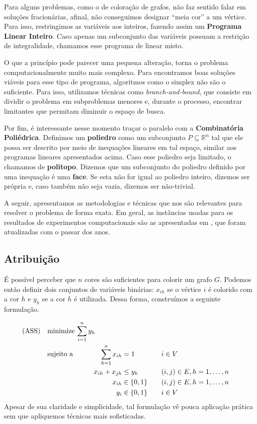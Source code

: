 \documentclass[11pt]{article}
\begin{document}
Para alguns problemas, como o de coloração de grafos, não faz sentido falar em soluções fracionárias, afinal, não conseguimos designar ``meia cor'' a um vértice.
Para isso, restringimos as variáveis aos inteiros, fazendo assim um \textbf{Programa Linear Inteiro}. Caso apenas um subconjunto das variáveis possuam a restrição de integralidade, chamamos esse programa de linear misto.

O que a princípio pode parecer uma pequena alteração, torna o problema computacionalmente muito mais complexo.
Para encontramos boas soluções viáveis para esse tipo de programa, algoritmos como o simplex não são o suficiente.
Para isso, utilizamos técnicas como \emph{branch-and-bound}, que consiste em dividir o problema em subproblemas menores e, durante o processo, encontrar limitantes que permitam diminuir o espaço de busca.

Por fim, é interessante nesse momento traçar o paralelo com a \textbf{Combinatória Poliédrica}.
Definimos um \textbf{poliedro} como um subconjunto \(P \subseteq \mathbb{R}^n\) tal que ele possa ser descrito por meio de inequações lineares em tal espaço, similar aos programas lineares apresentados acima.
Caso esse poliedro seja limitado, o chamamos de \textbf{politopo}.
Dizemos que um subconjunto do poliedro definido por uma inequação é uma \textbf{face}.
Se esta não for igual ao poliedro inteiro, dizemos ser própria e, caso também não seja vazia, dizemos ser não-trivial.

A seguir, apresentamos as metodologias e técnicas que nos são relevantes para resolver o problema de forma exata.
Em geral, as instâncias usadas para os resultados de experimentos computacionais são as apresentadas em \autocite{GraphColoringInstances}, que foram atualizadas com o passar dos anos.

\subsection{Atribuição}
\label{sec:org0833170}
É possível perceber que \(n\) cores são suficientes para colorir um grafo \(G\). Podemos então definir dois conjuntos de variáveis binárias: \(x_{ih}\) se o vértice \(i\) é colorido com a cor \(h\) e \(y_h\) se a cor \(h\) é utilizada. Dessa forma, construímos a seguinte formulação.

\begin{alignat*}{4}
\label{ass}
\mathrm{(ASS)} \quad & \omit\rlap{minimize  $\displaystyle \sum_{i=1}^n y_h$} \\
& \mbox{sujeito a}&& \quad & \sum_{h=1}^n x_{ih}&= 1        & \quad & i \in V \\
&                 &&   & x_{ih} + x_{jh}    & \leq y_h &   & (i,j) \in E, h=1,\dots,n \\
&                 &&   & x_{ih}    & \in \{0,1\} &   & (i,j) \in E, h=1,\dots,n\\
&                 &&   & y_i       & \in \{0,1\} &   & i \in V
\end{alignat*}
Apesar de sua claridade e simplicidade, tal formulação vê pouca aplicação prática sem que apliquemos técnicas mais sofisticadas.
\end{document}
